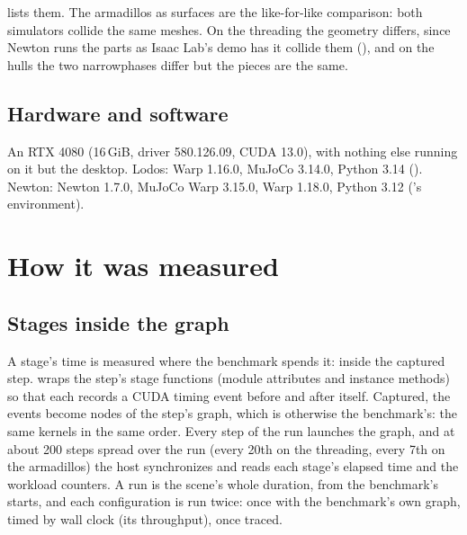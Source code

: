  lists them. The armadillos as surfaces are the like-for-like comparison: both simulators collide the same meshes. On the threading the geometry differs, since Newton runs the parts as Isaac Lab's demo has it collide them (), and on the hulls the two narrowphases differ but the pieces are the same.

\subsection{Hardware and software}\label{sec:versions}

An RTX 4080 (16\,GiB, driver 580.126.09, CUDA 13.0), with nothing else running on it but the desktop. Lodos: Warp 1.16.0, MuJoCo 3.14.0, Python 3.14 (). Newton: Newton 1.7.0, MuJoCo Warp 3.15.0, Warp 1.18.0, Python 3.12 ('s environment).

\section{How it was measured}\label{sec:method}

\subsection{Stages inside the graph}\label{sec:tracer}

A stage's time is measured where the benchmark spends it: inside the captured step.  wraps the step's stage functions (module attributes and instance methods) so that each records a CUDA timing event before and after itself. Captured, the events become nodes of the step's graph, which is otherwise the benchmark's: the same kernels in the same order. Every step of the run launches the graph, and at about 200 steps spread over the run (every 20th on the threading, every 7th on the armadillos) the host synchronizes and reads each stage's elapsed time and the workload counters. A run is the scene's whole duration, from the benchmark's starts, and each configuration is run twice: once with the benchmark's own graph, timed by wall clock (its throughput), once traced.

